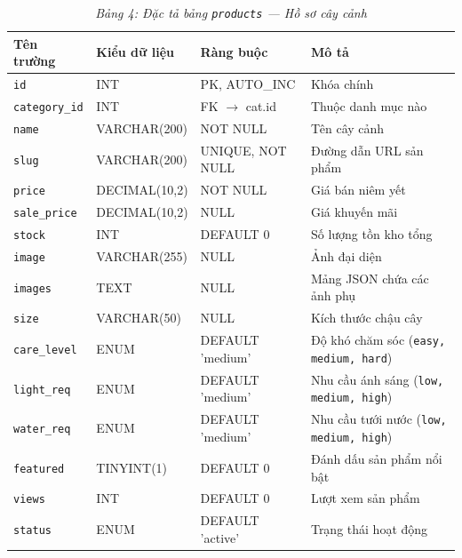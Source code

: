 \documentclass[11pt, a4paper]{article}
\begin{document}
\begin{table}[H]
    \centering
    \caption{\textit{Bảng 4: Đặc tả bảng \texttt{products} --- Hồ sơ cây cảnh}}
    \vspace{0.2cm}
    \begin{tabularx}{\linewidth}{|>{\raggedright\arraybackslash}p{3.5cm}|l|l|Y|}
        \hline
        \textbf{Tên trường} & \textbf{Kiểu dữ liệu} & \textbf{Ràng buộc} & \textbf{Mô tả} \\ \hline
        \texttt{id} & INT & PK, AUTO\_INC & Khóa chính \\ \hline
        \texttt{category\_id} & INT & FK $\rightarrow$ cat.id & Thuộc danh mục nào \\ \hline
        \texttt{name} & VARCHAR(200) & NOT NULL & Tên cây cảnh \\ \hline
        \texttt{slug} & VARCHAR(200) & UNIQUE, NOT NULL & Đường dẫn URL sản phẩm \\ \hline
        \texttt{price} & DECIMAL(10,2) & NOT NULL & Giá bán niêm yết \\ \hline
        \texttt{sale\_price} & DECIMAL(10,2) & NULL & Giá khuyến mãi \\ \hline
        \texttt{stock} & INT & DEFAULT 0 & Số lượng tồn kho tổng \\ \hline
        \texttt{image} & VARCHAR(255) & NULL & Ảnh đại diện \\ \hline
        \texttt{images} & TEXT & NULL & Mảng JSON chứa các ảnh phụ \\ \hline
        \texttt{size} & VARCHAR(50) & NULL & Kích thước chậu cây \\ \hline
        \texttt{care\_level} & ENUM & DEFAULT 'medium' & Độ khó chăm sóc (\texttt{easy, medium, hard}) \\ \hline
        \texttt{light\_req} & ENUM & DEFAULT 'medium' & Nhu cầu ánh sáng (\texttt{low, medium, high}) \\ \hline
        \texttt{water\_req} & ENUM & DEFAULT 'medium' & Nhu cầu tưới nước (\texttt{low, medium, high}) \\ \hline
        \texttt{featured} & TINYINT(1) & DEFAULT 0 & Đánh dấu sản phẩm nổi bật \\ \hline
        \texttt{views} & INT & DEFAULT 0 & Lượt xem sản phẩm \\ \hline
        \texttt{status} & ENUM & DEFAULT 'active' & Trạng thái hoạt động \\ \hline
    \end{tabularx}
\end{table}
\end{document}
